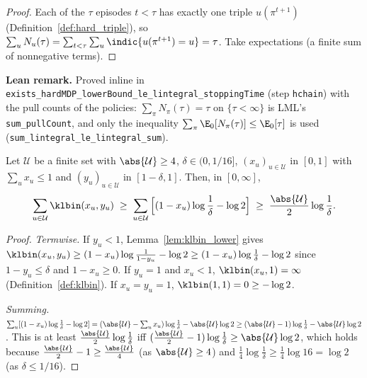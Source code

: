 \begin{proof}
\leanok
{}
Each of the $\tau$ episodes $t < \tau$ has exactly one triple $u(\pi^{t+1})$
(Definition~\ref{def:hard_triple}), so $\sum_u N_u(\tau) = \sum_{t<\tau}\sum_u\indic\{u(\pi^{t+1}) = u\} = \tau$.
Take expectations (a finite sum of nonnegative terms).
\end{proof}

\textbf{Lean remark.} Proved inline in \texttt{exists\_hardMDP\_lowerBound\_le\_lintegral\_stoppingTime}
(step \texttt{hchain}) with the pull counts of the policies: $\sum_\pi N_\pi(\tau) = \tau$ on
$\{\tau < \infty\}$ is LML's \texttt{sum\_pullCount}, and only the inequality
$\sum_\pi \E_0[N_\pi(\tau)] \le \E_0[\tau]$ is used (\texttt{sum\_lintegral\_le\_lintegral\_sum}).

\begin{lemma}\label{lem:hard_count_lower}
\leanok
Let $\mathcal U$ be a finite set with $\abs{\mathcal U} \ge 4$, $\delta \in (0, 1/16]$,
$(x_u)_{u \in \mathcal U}$ in $[0,1]$ with $\sum_u x_u \le 1$ and $(y_u)_{u \in \mathcal U}$ in
$[1 - \delta, 1]$. Then, in $[0, \infty]$,
\[
  \sum_{u \in \mathcal U}\klbin(x_u, y_u) \;\ge\; \sum_{u \in \mathcal U}\Big[(1 - x_u)\log\frac1\delta - \log 2\Big] \;\ge\; \frac{\abs{\mathcal U}}{2}\log\frac1\delta .
\]
\end{lemma}

\begin{proof}
\leanok
{}
\emph{Termwise.} If $y_u < 1$, Lemma~\ref{lem:klbin_lower} gives
$\klbin(x_u,y_u) \ge (1-x_u)\log\frac{1}{1-y_u} - \log 2 \ge (1-x_u)\log\frac1\delta - \log 2$
since $1 - y_u \le \delta$ and $1 - x_u \ge 0$. If $y_u = 1$ and $x_u < 1$, $\klbin(x_u, 1) = \infty$
(Definition~\ref{def:klbin}). If $x_u = y_u = 1$, $\klbin(1,1) = 0 \ge -\log 2$.

\emph{Summing.} $\sum_u[(1-x_u)\log\frac1\delta - \log 2] = (\abs{\mathcal U} - \sum_u x_u)\log\frac1\delta - \abs{\mathcal U}\log 2
\ge (\abs{\mathcal U} - 1)\log\frac1\delta - \abs{\mathcal U}\log 2$. This is at least
$\frac{\abs{\mathcal U}}{2}\log\frac1\delta$ iff $(\frac{\abs{\mathcal U}}{2} - 1)\log\frac1\delta \ge \abs{\mathcal U}\log 2$,
which holds because $\frac{\abs{\mathcal U}}{2} - 1 \ge \frac{\abs{\mathcal U}}{4}$ (as
$\abs{\mathcal U} \ge 4$) and $\frac14\log\frac1\delta \ge \frac14\log 16 = \log 2$ (as $\delta \le 1/16$).
\end{proof}

